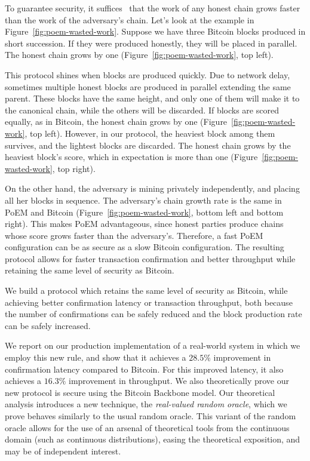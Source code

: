 To guarantee security, it suffices~\cite{eiar} that the work of any honest chain grows
faster than the work of the adversary's chain. Let's look at the example in Figure~\ref{fig:poem-wasted-work}.
Suppose we have three Bitcoin blocks produced in short succession.
If they were produced honestly, they will be placed in parallel.
The honest chain grows by one (Figure~\ref{fig:poem-wasted-work}, top left).

This protocol shines when blocks are produced quickly. Due to network delay, sometimes multiple honest blocks
are produced in parallel extending the same parent.
These blocks have the same height, and only one of them will
make it to the canonical chain, while the others will be discarded.
If blocks are scored equally, as in Bitcoin, the honest chain grows by one (Figure~\ref{fig:poem-wasted-work}, top left).
However, in our protocol, the heaviest block among them survives,
and the lightest blocks are discarded. The honest chain grows by the heaviest
block's score, which in expectation is more than one (Figure~\ref{fig:poem-wasted-work}, top right).

On the other hand, the adversary is mining privately independently, and placing all her blocks in sequence.
The adversary's chain growth rate is the same in PoEM and Bitcoin (Figure~\ref{fig:poem-wasted-work},
bottom left and bottom right).
This makes PoEM advantageous, since honest parties produce chains whose score grows faster
than the adversary's. Therefore, a fast PoEM configuration can be as secure as a slow Bitcoin
configuration. The resulting protocol allows for faster transaction confirmation and better
throughput while retaining the same level of security as Bitcoin.

\noindent
{}
We build a protocol which retains the same level of security as Bitcoin, while achieving
better confirmation latency or transaction throughput, both because the number of confirmations
can be safely reduced and the block production rate can be safely increased.

We report on our production implementation of a real-world system
in which we employ this new rule, and show that it achieves a $28.5\%$
improvement in confirmation latency compared to Bitcoin. For this improved
latency, it also achieves a $16.3\%$ improvement in throughput.
We also theoretically prove our new protocol is secure
using the Bitcoin Backbone model. Our theoretical analysis introduces
a new technique, the \emph{real-valued random oracle}, which we prove behaves
similarly to the usual random oracle. This variant of the
random oracle allows for the use of an arsenal of theoretical tools from the
continuous domain (such as continuous distributions), easing the theoretical
exposition, and may be of independent interest.

